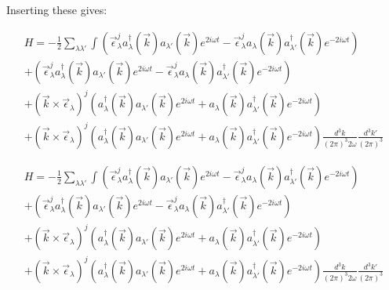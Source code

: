 \documentclass[a4]{article}
\begin{document}
    Inserting these gives:

    \begin{equation}
        \begin{aligned}
            H = - \frac{1}{2} \sum_{\lambda \lambda'} \int (\vec{\epsilon}_{\lambda}^{j} a^{\dagger}_{\lambda} (\vec{k}) a_{\lambda'} (\vec{k}) e^{2 i \omega t} - \vec{\epsilon}_{\lambda}^{j} a_{\lambda} (\vec{k}) a^{\dagger}_{\lambda'} (\vec{k}) e^{- 2 i \omega t}) \\
            + (\vec{\epsilon}_{\lambda}^{j} a^{\dagger}_{\lambda} (\vec{k}) a_{\lambda'} (\vec{k}) e^{2 i \omega t} - \vec{\epsilon}_{\lambda}^{j} a_{\lambda} (\vec{k}) a^{\dagger}_{\lambda'} (\vec{k}) e^{- 2 i \omega t}) \\
            + (\vec{k} \times \vec{\epsilon}_{\lambda})^{j} (a^{\dagger}_{\lambda} (\vec{k}) a_{\lambda'} (\vec{k}) e^{2 i \omega t} + a_{\lambda} (\vec{k}) a^{\dagger}_{\lambda'} (\vec{k}) e^{- 2 i \omega t}) \\
            + (\vec{k} \times \vec{\epsilon}_{\lambda})^{j} (a^{\dagger}_{\lambda} (\vec{k}) a_{\lambda'} (\vec{k}) e^{2 i \omega t} + a_{\lambda} (\vec{k}) a^{\dagger}_{\lambda'} (\vec{k}) e^{- 2 i \omega t}) 
            \frac{d^{3} k}{(2 \pi)^{3} 2 \omega} \frac{d^3 k'}{(2 \pi)^3}
        \end{aligned}
    \end{equation}

    \begin{equation}
        \begin{aligned}
            H = - \frac{1}{2} \sum_{\lambda \lambda'} \int (\vec{\epsilon}_{\lambda}^{j} a^{\dagger}_{\lambda} (\vec{k}) a_{\lambda'} (\vec{k}) e^{2 i \omega t} - \vec{\epsilon}_{\lambda}^{j} a_{\lambda} (\vec{k}) a^{\dagger}_{\lambda'} (\vec{k}) e^{- 2 i \omega t}) \\
            + (\vec{\epsilon}_{\lambda}^{j} a^{\dagger}_{\lambda} (\vec{k}) a_{\lambda'} (\vec{k}) e^{2 i \omega t} - \vec{\epsilon}_{\lambda}^{j} a_{\lambda} (\vec{k}) a^{\dagger}_{\lambda'} (\vec{k}) e^{- 2 i \omega t}) \\
            + (\vec{k} \times \vec{\epsilon}_{\lambda})^{j} (a^{\dagger}_{\lambda} (\vec{k}) a_{\lambda'} (\vec{k}) e^{2 i \omega t} + a_{\lambda} (\vec{k}) a^{\dagger}_{\lambda'} (\vec{k}) e^{- 2 i \omega t}) \\
            + (\vec{k} \times \vec{\epsilon}_{\lambda})^{j} (a^{\dagger}_{\lambda} (\vec{k}) a_{\lambda'} (\vec{k}) e^{2 i \omega t} + a_{\lambda} (\vec{k}) a^{\dagger}_{\lambda'} (\vec{k}) e^{- 2 i \omega t}) 
            \frac{d^{3} k}{(2 \pi)^{3} 2 \omega} \frac{d^3 k'}{(2 \pi)^3}
        \end{aligned}
    \end{equation}
\end{document}
